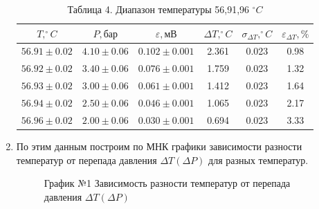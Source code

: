 \documentclass[a4paper]{article}
\begin{document}
\begin{enumerate}
\begin{table}[h!]
    \centering
    \begin{tabular}{|c|c|c|c|c|c|}
        \hline
        $T, ^\circ C$ & $P, \text{бар}$ & $\varepsilon, \text{мВ}$ & $\Delta T, ^\circ C$ & $\sigma_{\Delta T}, ^\circ C$ & $\varepsilon_{\Delta T}, \%$ \\
        \hline
        $56.91 \pm 0.02$ & $4.10 \pm 0.06$ & $0.102 \pm 0.001$ & 2.361 & 0.023 & 0.98 \\ \hline
        $56.92 \pm 0.02$ & $3.40 \pm 0.06$ & $0.076 \pm 0.001$ & 1.759 & 0.023 & 1.32 \\ \hline
        $56.93 \pm 0.02$ & $3.00 \pm 0.06$ & $0.061 \pm 0.001$ & 1.412 & 0.023 & 1.64 \\ \hline
        $56.94 \pm 0.02$ & $2.50 \pm 0.06$ & $0.046 \pm 0.001$ & 1.065 & 0.023 & 2.17 \\ \hline
        $56.96 \pm 0.02$ & $2.00 \pm 0.06$ & $0.030 \pm 0.001$ & 0.694 & 0.023 & 3.33 \\
        \hline
    \end{tabular}
    \caption{Таблица 4. Диапазон температуры 56,91,96 $^\circ C$}
\end{table}
\clearpage
\item По этим данным построим по МНК графики зависимости разности температур от перепада давления $\Delta T(\Delta P) $ для разных температур.
\begin{figure}[h!]
\caption[]{\label{} График №1 Зависимость разности температур от перепада давления $\Delta T(\Delta P)$}
\end{figure}


\end{enumerate}
\end{document}
